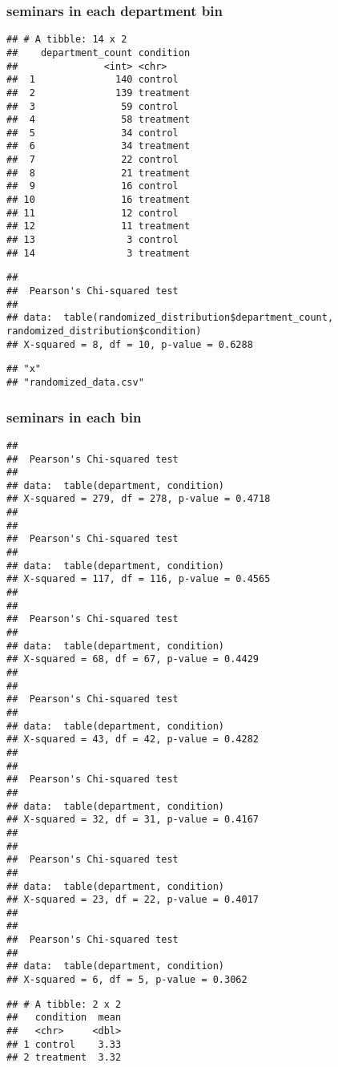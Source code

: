 \documentclass[
]{article}
\begin{document}
\newpage

\subsubsection{seminars in each department
bin}\label{seminars-in-each-department-bin}

\begin{verbatim}
## # A tibble: 14 x 2
##    department_count condition
##               <int> <chr>    
##  1              140 control  
##  2              139 treatment
##  3               59 control  
##  4               58 treatment
##  5               34 control  
##  6               34 treatment
##  7               22 control  
##  8               21 treatment
##  9               16 control  
## 10               16 treatment
## 11               12 control  
## 12               11 treatment
## 13                3 control  
## 14                3 treatment
\end{verbatim}

\begin{verbatim}
## 
##  Pearson's Chi-squared test
## 
## data:  table(randomized_distribution$department_count, randomized_distribution$condition)
## X-squared = 8, df = 10, p-value = 0.6288
\end{verbatim}

\begin{verbatim}
## "x"
## "randomized_data.csv"
\end{verbatim}

\newpage

\subsubsection{seminars in each bin}\label{seminars-in-each-bin}

\begin{verbatim}
## 
##  Pearson's Chi-squared test
## 
## data:  table(department, condition)
## X-squared = 279, df = 278, p-value = 0.4718
## 
## 
##  Pearson's Chi-squared test
## 
## data:  table(department, condition)
## X-squared = 117, df = 116, p-value = 0.4565
## 
## 
##  Pearson's Chi-squared test
## 
## data:  table(department, condition)
## X-squared = 68, df = 67, p-value = 0.4429
## 
## 
##  Pearson's Chi-squared test
## 
## data:  table(department, condition)
## X-squared = 43, df = 42, p-value = 0.4282
## 
## 
##  Pearson's Chi-squared test
## 
## data:  table(department, condition)
## X-squared = 32, df = 31, p-value = 0.4167
## 
## 
##  Pearson's Chi-squared test
## 
## data:  table(department, condition)
## X-squared = 23, df = 22, p-value = 0.4017
## 
## 
##  Pearson's Chi-squared test
## 
## data:  table(department, condition)
## X-squared = 6, df = 5, p-value = 0.3062
\end{verbatim}

\begin{verbatim}
## # A tibble: 2 x 2
##   condition  mean
##   <chr>     <dbl>
## 1 control    3.33
## 2 treatment  3.32
\end{verbatim}
\end{document}
